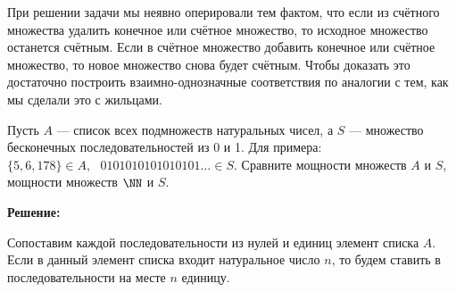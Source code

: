 \documentclass[12pt, a4paper, oneside]{article}
\begin{document}
При решении задачи мы неявно оперировали тем фактом, что если из счётного множества удалить конечное или счётное множество, то исходное множество останется счётным. Если в счётное множество добавить конечное или счётное множество, то новое множество снова будет счётным. Чтобы доказать это достаточно построить взаимно-однозначные соответствия по аналогии с тем, как мы сделали это с жильцами.

\begin{problem}{}
    Пусть $A$ --- список всех подмножеств натуральных чисел, а $S$ --- множество бесконечных последовательностей из 0 и 1. Для примера: $\{5,6,178\} \in A, \mbox{ } 0101010101010101 \ldots \in S$. Сравните мощности множеств $A$ и $S$, мощности множеств $\NN$ и $S$.
\end{problem}

\textbf{Решение:}

Сопоставим каждой последовательности из нулей и единиц элемент списка $A$. Если в данный элемент списка входит  натуральное число $n$, то будем ставить в последовательности на месте $n$ единицу.
\end{document}
